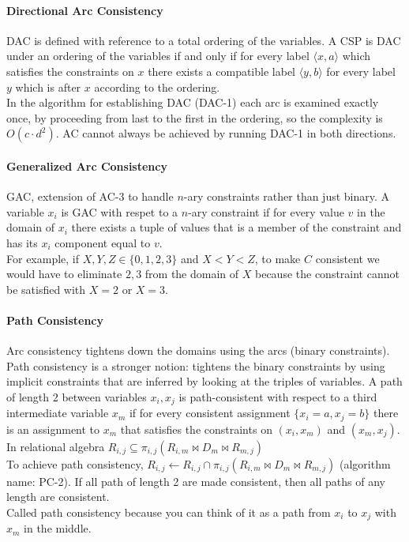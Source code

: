 \documentclass[10pt]{report}
\begin{document}
\paragraph{Directional Arc Consistency} DAC is defined with reference to a total ordering of the variables. A CSP is DAC under an ordering of the variables if and only if for every label $\langle x, a\rangle$ which satisfies the constraints on $x$ there exists a compatible label $\langle y,b\rangle$ for every label $y$ which is after $x$ according to the ordering.\\
In the algorithm for establishing DAC (DAC-1) each arc is examined exactly once, by proceeding from last to the first in the ordering, so the complexity is $O(c\cdot d^2)$. AC cannot always be achieved by running DAC-1 in both directions.
\paragraph{Generalized Arc Consistency} GAC, extension of AC-3 to handle $n$-ary constraints rather than just binary. A variable $x_i$ is GAC with respet to a $n$-ary constraint if for every value $v$ in the domain of $x_i$ there exists a tuple of values that is a member of the constraint and has its $x_i$ component equal to $v$.\\
For example, if $X, Y, Z \in \{0,1,2,3\}$ and $X < Y < Z$, to make $C$ consistent we would have to eliminate $2, 3$ from the domain of $X$ because the constraint cannot be satisfied with $X=2$ or $X=3$.
\paragraph{Path Consistency} Arc consistency tightens down the domains using the arcs (binary constraints). Path consistency is a stronger notion: tightens the binary constraints by using implicit constraints that are inferred by looking at the triples of variables. A path of length 2 between variables $x_i, x_j$ is path-consistent with respect to a third intermediate variable $x_m$ if for every consistent assignment $\{x_i = a, x_j = b\}$ there is an assignment to $x_m$ that satisfies the constraints on $(x_i, x_m)$ and $(x_m, x_j)$. In relational algebra $R_{i,j}\subseteq\pi_{i,j}(R_{i,m}\bowtie D_m\bowtie R_{m,j})$\\
To achieve path consistency, $R_{i,j}\leftarrow R_{i,j}\cap\pi_{i,j}(R_{i,m}\bowtie D_m\bowtie R_{m,j})$ (algorithm name: PC-2). If all path of length 2 are made consistent, then all paths of any length are consistent.\\
Called path consistency because you can think of it as a path from $x_i$ to $x_j$ with $x_m$ in the middle.
\end{document}
